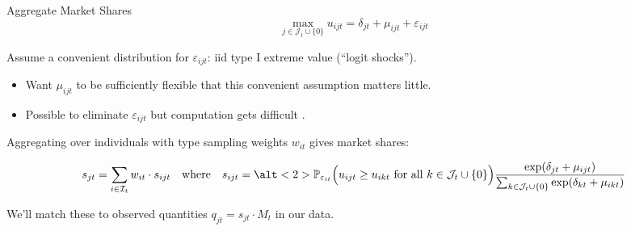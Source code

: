 \documentclass[aspectratio=169,t,11pt,table]{beamer}
\begin{document}
\begin{frame}{Aggregate Market Shares}
    \vspace{-\baselineskip}
    \begin{equation*}
        \max_{j \in \mathcal{J}_t \cup \{0\}} u_{ijt} = \delta_{jt} + \mu_{ijt} + \varepsilon_{ijt}
    \end{equation*}
    \vspace{-0.5\baselineskip}
    \begin{wideitemize}
        \item Assume a convenient distribution for $\varepsilon_{ijt}$: iid type I extreme value (``logit shocks'').
        \begin{itemize}
            \item Want $\mu_{ijt}$ to be sufficiently flexible that this convenient assumption matters little.
            \item Possible to eliminate $\varepsilon_{ijt}$ but computation gets difficult \citep{berry2007pure}.
        \end{itemize}
        \pause
        \item Aggregating over individuals with type sampling weights $w_{it}$ gives market shares:
        \begin{minipage}[c][3\baselineskip][c]{\textwidth}
            \begin{equation*}
                s_{jt} = \sum_{i \in \mathcal{I}_t} w_{it} \cdot s_{ijt} \quad\text{where}\quad s_{ijt} = \alt<2>{\Pr_{\varepsilon_{it}}\Big(u_{ijt} \geq u_{ikt} \text{ for all } k \in \mathcal{J}_t \cup \{0\}\Big)}{\frac{\exp(\delta_{jt} + \mu_{ijt})}{\sum_{k \in \mathcal{J}_t \cup \{0\}} \exp(\delta_{kt} + \mu_{ikt})}}
            \end{equation*}
        \end{minipage}
        \vspace{-\baselineskip}
        \pause\pause
        \item We'll match these to observed quantities $q_{jt} = s_{jt} \cdot M_t$ in our data.
    \end{wideitemize}
\end{frame}
\end{document}
